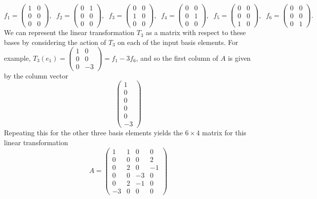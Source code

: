 \documentclass[11pt]{article}
\begin{document}
\begin{enumerate}
$$f_1 = \begin{pmatrix} 1 & 0 \\ 0 & 0 \\ 0 & 0 \end{pmatrix}, \;\; f_2 = \begin{pmatrix} 0 & 1 \\ 0 & 0 \\ 0 & 0 \end{pmatrix}, \;\; f_3 = \begin{pmatrix} 0 & 0 \\ 1 & 0 \\ 0 & 0 \end{pmatrix}, \;\; f_4 = \begin{pmatrix} 0 & 0 \\ 0 & 1 \\ 0 & 0 \end{pmatrix}, \;\; f_5 = \begin{pmatrix} 0 & 0 \\ 0 & 0 \\ 1 & 0 \end{pmatrix}, \;\; f_6 = \begin{pmatrix} 0 & 0 \\ 0 & 0 \\ 0 & 1 \end{pmatrix}.$$
We can represent the linear transformation $T_3$ as a matrix with respect to these bases by considering the action of $T_3$ on each of the input basis elements. For example, $T_3(e_1) = \begin{pmatrix}1 & 0 \\ 0 & 0 \\ 0 & -3 \end{pmatrix} = f_1 - 3f_6$, and so the first column of $A$ is given by the column vector
$$\begin{pmatrix} 1 \\ 0 \\ 0 \\ 0 \\ 0 \\ -3 \end{pmatrix}$$
Repeating this for the other three basis elements yields the $6\times 4$ matrix for this linear transformation 
$$A = \begin{pmatrix} 1 & 1 & 0 & 0 \\ 0 & 0 & 0 & 2 \\ 0 & 2 & 0 & -1 \\ 0 & 0 & -3 & 0 \\ 0 & 2 & -1 & 0 \\ -3 & 0 & 0 & 0 \end{pmatrix} $$


\end{enumerate}
\end{document}
